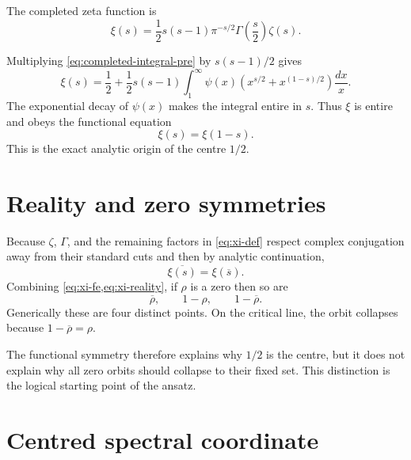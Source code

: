 \begin{definition}
The completed zeta function is
\begin{equation}
 \xi(s)=\frac12 s(s-1)\pi^{-s/2}\Gamma\!\left(\frac{s}{2}\right)\zeta(s).
 \label{eq:xi-def}
\end{equation}
\end{definition}
Multiplying \cref{eq:completed-integral-pre} by $s(s-1)/2$ gives
\begin{equation}
 \xi(s)=\frac12+\frac12s(s-1)
 \int_1^{\infty}\psi(x)
 \left(x^{s/2}+x^{(1-s)/2}\right)\frac{dx}{x}.
 \label{eq:xi-integral}
\end{equation}
The exponential decay of $\psi(x)$ makes the integral entire in $s$. Thus $\xi$ is entire and obeys the functional equation
\begin{equation}
 \xi(s)=\xi(1-s).
 \label{eq:xi-fe}
\end{equation}
This is the exact analytic origin of the centre $1/2$.

\section{Reality and zero symmetries}

Because $\zeta$, $\Gamma$, and the remaining factors in \cref{eq:xi-def} respect complex conjugation away from their standard cuts and then by analytic continuation,
\begin{equation}
 \overline{\xi(s)}=\xi(\overline{s}).
 \label{eq:xi-reality}
\end{equation}
Combining \cref{eq:xi-fe,eq:xi-reality}, if $\rho$ is a zero then so are
\[
 \overline{\rho},\qquad 1-\rho,\qquad 1-\overline{\rho}.
\]
Generically these are four distinct points. On the critical line, the orbit collapses because $1-\overline{\rho}=\rho$.

The functional symmetry therefore explains why $1/2$ is the centre, but it does not explain why all zero orbits should collapse to their fixed set. This distinction is the logical starting point of the ansatz.

\section{Centred spectral coordinate}

